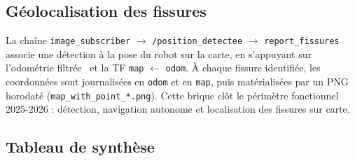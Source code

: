 \documentclass[12pt,a4paper]{article}
\begin{document}
\subsection{Géolocalisation des fissures}

La chaîne \texttt{image\_subscriber} $\rightarrow$ \texttt{/position\_detectee} $\rightarrow$ \texttt{report\_fissures} associe une détection à la pose du robot sur la carte, en s'appuyant sur l'odométrie filtrée~\cite{robot_localization} et la TF \texttt{map} $\leftarrow$ \texttt{odom}. À chaque fissure identifiée, les coordonnées sont journalisées en \texttt{odom} et en \texttt{map}, puis matérialisées par un PNG horodaté (\texttt{map\_with\_point\_*.png}). Cette brique clôt le périmètre fonctionnel 2025-2026 : détection, navigation autonome et localisation des fissures sur carte.

\subsection{Tableau de synthèse}
\end{document}
